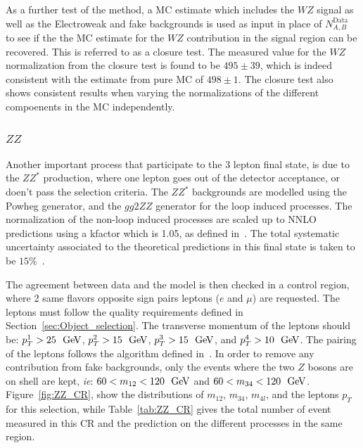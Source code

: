 As a further test of the method, a MC estimate which includes the $WZ$ signal as
well as the Electroweak and fake backgrounds is used as input in place 
of $N^{\textrm{Data}}_{A,B}$ to see if the the MC estimate for the $WZ$
contribution in the signal region can be recovered. This is referred to as
a closure test.  The measured value for the $WZ$ normalization from the 
closure test is found to be  $495\pm39$, which is indeed consistent with the
estimate from pure MC of $498\pm1$. The closure test also shows consistent
results when varying the normalizations of the different compoenents 
in the MC independently.




\subsubsection{$ZZ$}
\label{sec:zzbg}

Another important process that participate to the 3 lepton final state, is due to the $ZZ^{*}$ production, where one lepton goes out of the detector acceptance, or doen't pass the selection criteria. The $ZZ^{*}$ backgrounds are modelled using the Powheg generator, and the $gg2ZZ$ generator for the loop induced processes. The normalization of the non-loop induced processes are scaled up to NNLO predictions using a kfactor which is 1.05, as defined in~\cite{Cascioli:2014yka,Baglio:2013toa,Bierweiler:2013dja}. The total systematic uncertainty associated to the theoretical predictions in this final state is taken to be $15\%$~\cite{Cascioli:2014yka,Baglio:2013toa,Bierweiler:2013dja}.

The agreement between data and the model is then checked in a control region, where 2 same flavors opposite sign pairs leptons ($e$ and $\mu$) are requested. The leptons must follow the quality requirements defined in Section~\ref{sec:Object_selection}. The transverse momentum of the leptons should be: $p_{T}^{1}>25~\GeV$, $p_{T}^{2}>15~\GeV$, $p_{T}^{3}>15~\GeV$, and  $p_{T}^{4}>10~\GeV$. The pairing of the leptons follows the algorithm defined in~\cite{Aad:2014wra}. In order to remove any contribution from fake backgrounds, only the events where the two $Z$ bosons are on shell are kept, \textit{ie}: $60<m_{12}<120~\GeV$ and $60<m_{34}<120~\GeV$. Figure~\ref{fig:ZZ_CR}, show the distributions of $m_{12}$, $m_{34}$, $m_{4l}$, and the leptons $p_{T}$ for this selection, while Table~\ref{tab:ZZ_CR} gives the total number of event measured in this CR and the prediction on the different processes in the same region.

